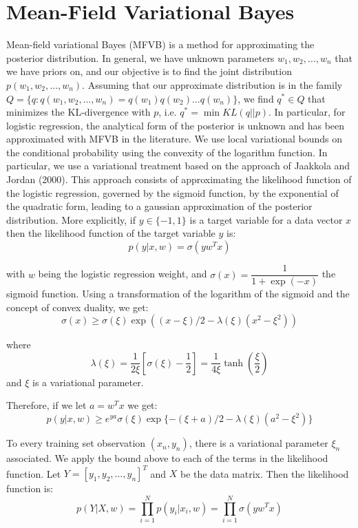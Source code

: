 
\section{Mean-Field Variational Bayes}\label{sec:mfvb}

Mean-field variational Bayes (MFVB) is a method for approximating the posterior distribution.  In general, we have unknown parameters $w_1, w_2, \ldots, w_n$ that we have priors on, and our objective is to find the joint distribution $p(w_1, w_2, \ldots, w_n)$.  Assuming that our approximate distribution is in the family $Q = \{q : q(w_1, w_2, \ldots, w_n) = q(w_1)q(w_2) \ldots q(w_n)\}$, we find $q^* \in Q$ that minimizes the KL-divergence with $p$, i.e. $q^* = \min KL(q || p)$. 
In particular, for logistic regression, the analytical form of the posterior is unknown and has been approximated with MFVB in the literature. We use local variational bounds on the conditional probability using the convexity of the logarithm function. In particular, we use a variational treatment based on the approach of Jaakkola and Jordan (2000). 
This approach consists of approximating the likelihood function of the logistic regression, governed by the sigmoid function, by the exponential of the quadratic form, leading to a gaussian approximation of the posterior distribution. More explicitly, if $y\in \{-1,1\}$ is a target variable for a data vector $x$ then the likelihood function of the target variable $y$ is: 
\begin{equation}
p(y | x, w)=\sigma(y w^T x)
\end{equation}

with $w$ being the logistic regression weight, and $\sigma(x)=\dfrac{1}{1+\exp(-x)}$ the sigmoid function. 
Using a transformation of the logarithm of the sigmoid and the concept of convex duality, we get: 
\begin{equation}
\sigma(x) \geq \sigma(\xi)\exp((x-\xi)/2-\lambda(\xi)(x^2-\xi^2))
\end{equation}

where
$$\lambda(\xi)=\frac{1}{2\xi}[\sigma(\xi)-\frac{1}{2}]=\frac{1}{4\xi}\tanh(\frac{\xi}{2})$$
and $\xi$ is a variational parameter. 

Therefore, if we let $a=w^T x$ we get: 
\begin{equation}
p( y | x,w)\geq e^{ya} \sigma(\xi)\exp\{-(\xi+a)/2-\lambda(\xi)(a^2-\xi^2)\}
\end{equation}

To every training set observation $(x_n, y_n)$, there is a variational parameter $\xi_n$ associated. We apply the bound above to each of the terms in the likelihood function. Let $Y=[y_1, y_2, \ldots , y_n]^T$ and $X$ be the data matrix. Then the likelihood function is: 
\begin{equation}
p( Y | X, w)=\prod_{i=1}^{N} p(y_i | x_i, w) = \prod_{i=1}^{N} \sigma(y w^T x)
\end{equation}

